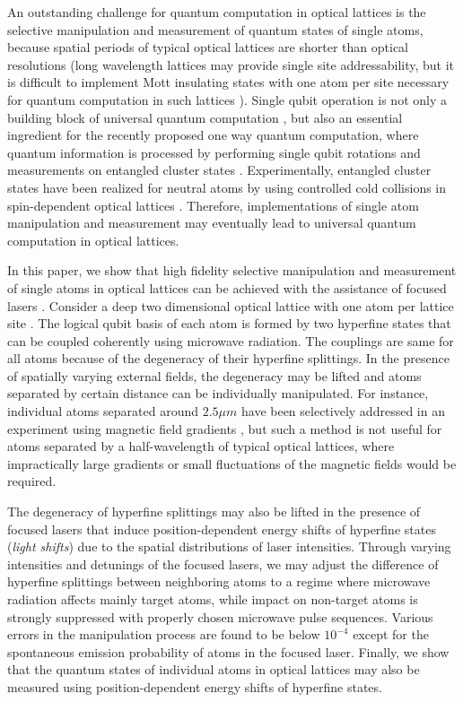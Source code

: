 \documentclass[pra,aps,showpacs,twocolumn]{revtex4}
\begin{document}
An outstanding challenge for quantum computation in optical lattices is the
selective manipulation and measurement of quantum states of single atoms,
because spatial periods of typical optical lattices are shorter than optical
resolutions (long wavelength lattices may provide single site
addressability, but it is difficult to implement Mott insulating states with
one atom per site necessary for quantum computation in such lattices \cite%
{Scheun}). Single qubit operation is not only a building block of universal
quantum computation \cite{Barenco}, but also an essential ingredient for the
recently proposed one way quantum computation, where quantum information is
processed by performing single qubit rotations and measurements on entangled
cluster states \cite{Raussendorf}. Experimentally, entangled cluster states
have been realized for neutral atoms by using controlled cold collisions in
spin-dependent optical lattices \cite{Mandel1}. Therefore, implementations
of single atom manipulation and measurement may eventually lead to universal
quantum computation in optical lattices.

In this paper, we show that high fidelity selective manipulation and
measurement of single atoms in optical lattices can be achieved with the
assistance of focused lasers \cite{Rolston}. Consider a deep two dimensional
optical lattice with one atom per lattice site \cite{Greiner}. The logical
qubit basis of each atom is formed by two hyperfine states that can be
coupled coherently using microwave radiation. The couplings are same for all
atoms because of the degeneracy of their hyperfine splittings. In the
presence of spatially varying external fields, the degeneracy may be lifted
and atoms separated by certain distance can be individually manipulated. For
instance, individual atoms separated around $2.5\mu m$ have been selectively
addressed in an experiment using magnetic field gradients \cite{Schrader},
but such a method is not useful for atoms separated by a half-wavelength of
typical optical lattices, where impractically large gradients or small
fluctuations of the magnetic fields would be required.

The degeneracy of hyperfine splittings may also be lifted in the presence of
focused lasers that induce position-dependent energy shifts of hyperfine
states (\textit{light shifts}) \cite{Metcalf} due to the spatial
distributions of laser intensities. Through varying intensities and
detunings of the focused lasers, we may adjust the difference of hyperfine
splittings between neighboring atoms to a regime where microwave radiation
affects mainly target atoms, while impact on non-target atoms is strongly
suppressed with properly chosen microwave pulse sequences. Various errors in
the manipulation process are found to be below $10^{-4}$ except for the
spontaneous emission probability of atoms in the focused laser. Finally, we
show that the quantum states of individual atoms in optical lattices may
also be measured using position-dependent energy shifts of hyperfine states.
\end{document}
